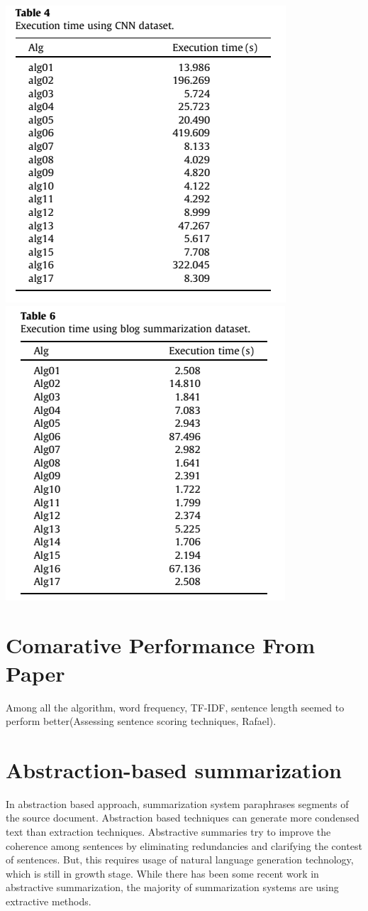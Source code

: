 \documentclass[conference]{IEEEtran}
\begin{document}
\includegraphics[scale=.4]{cnn3}
\includegraphics[scale=.4]{blg3}
\section{Comarative Performance From Paper}
Among all the algorithm, word frequency, TF-IDF, sentence length seemed to perform better(Assessing sentence scoring techniques, Rafael).
\section{Abstraction-based summarization}
In abstraction based approach, summarization system paraphrases segments of the source document. Abstraction based techniques can generate more condensed text than extraction techniques. Abstractive summaries try to improve the coherence among sentences by eliminating redundancies and clarifying the contest of sentences. But, this requires usage of natural language generation technology, which is still in growth stage. While there has been some recent work in abstractive summarization, the majority of summarization systems are using extractive methods.
\end{document}

